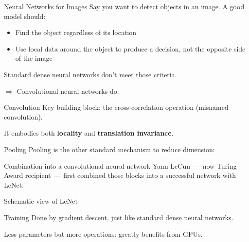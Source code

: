 \begin{frame}{Neural Networks for Images}
  Say you want to detect objects in an image. A good model should:
  \begin{itemize}
    \item Find the object regardless of its location
    \item Use local data around the object to produce a decision, not the opposite side of the image
  \end{itemize}

  Standard dense neural networks don't meet those criteria.

  $\Rightarrow$ Convolutional neural networks do.
\end{frame}

\begin{frame}{Convolution}
  Key building block: the cross-correlation operation (misnamed convolution).

  It embodies both \textbf{locality} and \textbf{translation invariance}.

\end{frame}

\begin{frame}{Pooling}
  Pooling is the other standard mechanism to reduce dimension:

\end{frame}

\begin{frame}{Combination into a convolutional neural network}
  Yann LeCun ---~now Turing Award recipient~--- first combined those blocks into a successful network with LeNet:

\end{frame}

\begin{frame}{Schematic view of LeNet}
\end{frame}

\begin{frame}{Training}
  Done by gradient descent, just like standard dense neural networks.

  Less parameters but more operations: greatly benefits from GPUs.

\end{frame}

